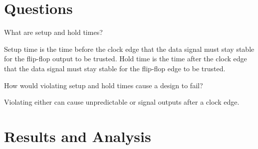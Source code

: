 \documentclass[CMPE]{KGCOEReport}
\begin{document}
\maketitle

\section*{Questions}

What are setup and hold times?

Setup time is the time before the clock edge that the data signal must stay
stable for the flip-flop output to be trusted. Hold time is the time after the
clock edge that the data signal must stay stable for the flip-flop edge to be
trusted.

How would violating setup and hold times cause a design to fail?

Violating either can cause unpredictable or signal outputs after a clock edge.

\section*{Results and Analysis}
\end{document}
